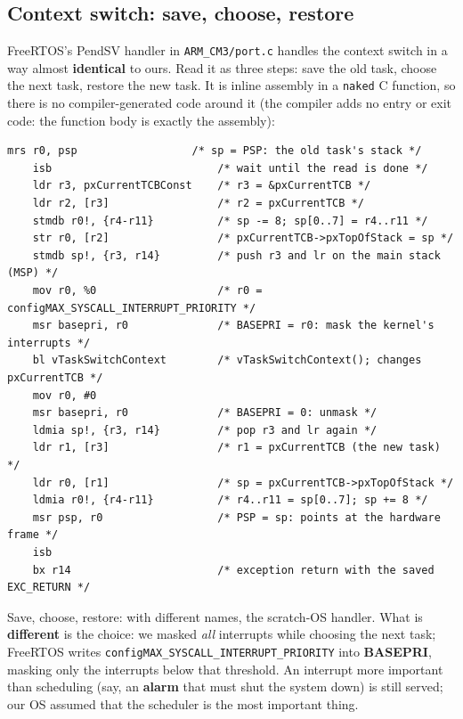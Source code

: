 \subsection{Context switch: save, choose, restore}
FreeRTOS's PendSV handler in \texttt{ARM\_CM3/port.c} handles the context switch in a way almost \textbf{identical} to ours. Read it as three steps: save the old task, choose the next task, restore the new task. It is inline assembly in a \texttt{naked} C function, so there is no compiler-generated code around it (the compiler adds no entry or exit code: the function body is exactly the assembly):
\begin{lstlisting}[basicstyle=\ttfamily\scriptsize]
    mrs r0, psp                  /* sp = PSP: the old task's stack */
    isb                          /* wait until the read is done */
    ldr r3, pxCurrentTCBConst    /* r3 = &pxCurrentTCB */
    ldr r2, [r3]                 /* r2 = pxCurrentTCB */
    stmdb r0!, {r4-r11}          /* sp -= 8; sp[0..7] = r4..r11 */
    str r0, [r2]                 /* pxCurrentTCB->pxTopOfStack = sp */
    stmdb sp!, {r3, r14}         /* push r3 and lr on the main stack (MSP) */
    mov r0, %0                   /* r0 = configMAX_SYSCALL_INTERRUPT_PRIORITY */
    msr basepri, r0              /* BASEPRI = r0: mask the kernel's interrupts */
    bl vTaskSwitchContext        /* vTaskSwitchContext(); changes pxCurrentTCB */
    mov r0, #0
    msr basepri, r0              /* BASEPRI = 0: unmask */
    ldmia sp!, {r3, r14}         /* pop r3 and lr again */
    ldr r1, [r3]                 /* r1 = pxCurrentTCB (the new task) */
    ldr r0, [r1]                 /* sp = pxCurrentTCB->pxTopOfStack */
    ldmia r0!, {r4-r11}          /* r4..r11 = sp[0..7]; sp += 8 */
    msr psp, r0                  /* PSP = sp: points at the hardware frame */
    isb
    bx r14                       /* exception return with the saved EXC_RETURN */
\end{lstlisting}
Save, choose, restore: with different names, the scratch-OS handler. What is \textbf{different} is the choice: we masked \emph{all} interrupts while choosing the next task; FreeRTOS writes \texttt{configMAX\_SYSCALL\_INTERRUPT\_PRIORITY} into \textbf{BASEPRI}, masking only the interrupts below that threshold. An interrupt more important than scheduling (say, an \textbf{alarm} that must shut the system down) is still served; our OS assumed that the scheduler is the most important thing.

